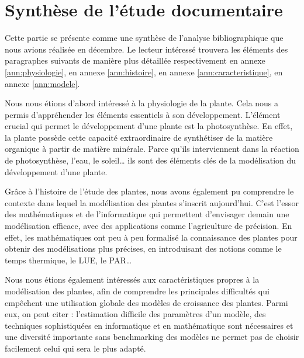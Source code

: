 \section{Synthèse de l'étude documentaire}
Cette partie se présente comme une synthèse de l’analyse bibliographique que nous avions réalisée en décembre.
Le lecteur intéressé trouvera les éléments des paragraphes suivants de manière plus détaillée respectivement en annexe \ref{ann:physiologie}, en annexe \ref{ann:histoire}, en annexe \ref{ann:caracteristique}, en annexe \ref{ann:modele}.





Nous nous étions d’abord intéressé à la physiologie de la plante. Cela nous a permis d’appréhender les éléments essentiels à son développement.
L’élément crucial qui permet le développement d’une plante est la photosynthèse. En effet, la plante possède cette capacité extraordinaire de synthétiser de la matière organique à partir de matière minérale. 
Parce qu’ils interviennent dans la réaction de photosynthèse, l’eau, le soleil… ils sont des éléments clés de la modélisation du développement d’une plante.

 
Grâce à l’histoire de l’étude des plantes, nous avons également pu comprendre le contexte dans lequel la modélisation des plantes s’inscrit aujourd’hui. C’est l’essor des mathématiques et de l’informatique qui permettent d’envisager demain une modélisation efficace, avec des applications comme l’agriculture de précision. 
En effet, les mathématiques ont peu à peu formalisé la connaissance des plantes pour obtenir des modélisations plus précises, en introduisant des notions comme le temps thermique, le LUE, le PAR…

Nous nous étions également intéressés aux caractéristiques propres à la modélisation des plantes, afin de comprendre les principales difficultés qui empêchent une utilisation globale des modèles de croissance des plantes. Parmi eux, on peut citer : l’estimation difficile des paramètres d’un modèle, des techniques sophistiquées en informatique et en mathématique sont nécessaires et une diversité importante sans benchmarking des modèles ne permet pas de choisir facilement celui qui sera le plus adapté. 

